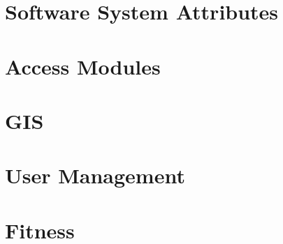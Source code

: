 \documentclass{article}
\begin{document}
\section{Software System Attributes}
	
\clearpage

\section{Access Modules}
	
\clearpage

\section{GIS}
	
\clearpage

\section{User Management}
	
\clearpage

\section{Fitness}
	
\end{document}
